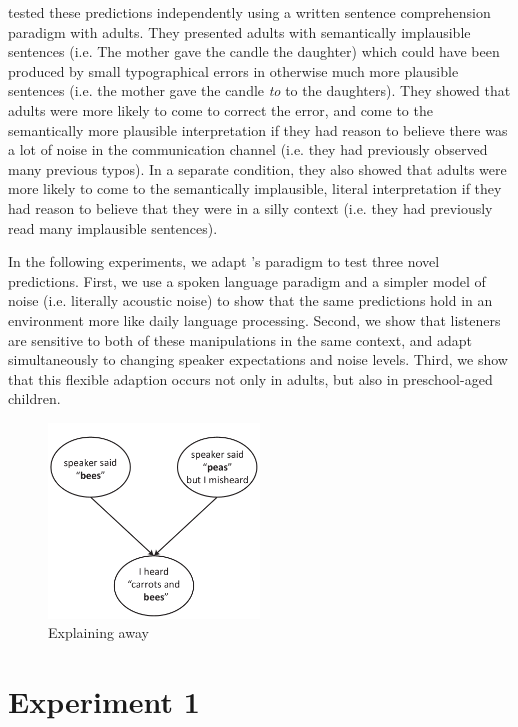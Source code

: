 \documentclass[man,floatsintext]{apa6}
\begin{document}
 tested these predictions independently using a written sentence comprehension paradigm with adults. They presented adults with semantically implausible sentences (i.e. The mother gave the candle the daughter) which could have been produced by small typographical errors in otherwise much more plausible sentences (i.e. the mother gave the candle \emph{to} to the daughters). They showed that adults were more likely to come to correct the error, and come to the semantically more plausible interpretation if they had reason to believe there was a lot of noise in the communication channel (i.e. they had previously observed many previous typos). In a separate condition, they also showed that adults were more likely to come to the semantically implausible, literal interpretation if they had reason to believe that they were in a silly context (i.e. they had previously read many implausible sentences).

In the following experiments, we adapt 's paradigm to test three novel predictions. First, we use a spoken language paradigm and a simpler model of noise (i.e. literally acoustic noise) to show that the same predictions hold in an environment more like daily language processing. Second, we show that listeners are sensitive to both of these manipulations in the same context, and adapt simultaneously to changing speaker expectations and noise levels. Third, we show that this flexible adaption occurs not only in adults, but also in preschool-aged children.

\begin{figure}[t]
     \begin{center}
     \includegraphics[width=0.5\textwidth]{figures/explaining_away.pdf}
    \end{center}
    \caption{Explaining away}%
   \label{fig:explaining_away}
\end{figure}

\section{Experiment 1}
\end{document}
